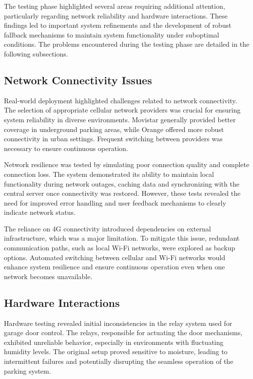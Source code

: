 The testing phase highlighted several areas requiring additional attention, particularly regarding network reliability and hardware interactions. These findings led to important system refinements and the development of robust fallback mechanisms to maintain system functionality under suboptimal conditions. The problems encountered during the testing phase are detailed in the following subsections.

\subsection{Network Connectivity Issues}

Real-world deployment highlighted challenges related to network connectivity. The selection of appropriate cellular network providers was crucial for ensuring system reliability in diverse environments. Movistar generally provided better coverage in underground parking areas, while Orange offered more robust connectivity in urban settings. Frequent switching between providers was necessary to ensure continuous operation. 

Network resilience was tested by simulating poor connection quality and complete connection loss. The system demonstrated its ability to maintain local functionality during network outages, caching data and synchronizing with the central server once connectivity was restored. However, these tests revealed the need for improved error handling and user feedback mechanisms to clearly indicate network status. 

The reliance on 4G connectivity introduced dependencies on external infrastructure, which was a major limitation. To mitigate this issue, redundant communication paths, such as local Wi-Fi networks, were explored as backup options. Automated switching between cellular and Wi-Fi networks would enhance system resilience and ensure continuous operation even when one network becomes unavailable.

\subsection{Hardware Interactions}

Hardware testing revealed initial inconsistencies in the relay system used for garage door control. The relays, responsible for actuating the door mechanisms, exhibited unreliable behavior, especially in environments with fluctuating humidity levels. The original setup proved sensitive to moisture, leading to intermittent failures and potentially disrupting the seamless operation of the parking system. 


